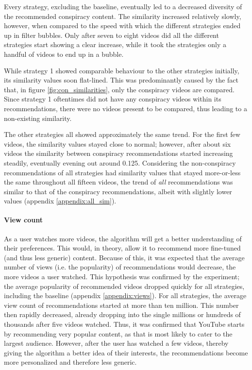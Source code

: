 \documentclass[../main.tex]{subfiles}
\begin{document}
Every strategy, excluding the baseline, eventually led to a decreased diversity of the recommended conspiracy 
content. The similarity increased relatively slowly, however, when compared to the speed with which the 
different strategies ended up in filter bubbles. Only after seven to eight videos did all the different 
strategies start showing a clear increase, while it took the strategies only a handful of videos to end up 
in a bubble.

While strategy 1 showed comparable behaviour to the other strategies initially, its similarity values soon 
flat-lined. This was predominantly caused by the fact that, in figure \ref{fig:con_similarities}, only the 
conspiracy videos are compared. Since strategy 1 oftentimes did not have any conspiracy videos within its 
recommendations, there were no videos present to be compared, thus leading to a non-existing similarity. 

The other strategies all showed approximately the same trend. For the first few videos, the similarity values 
stayed close to normal; however, after about six videos the similarity between conspiracy recommendations 
started increasing steadily, eventually evening out around 0.125. Considering the non-conspiracy recommendations
of all strategies had similarity values that stayed more-or-less the same throughout all fifteen videos, the 
trend of \textit{all} recommendations was similar to that of the conspiracy recommendations, albeit with 
slightly lower values (appendix \ref{appendix:all_sim}).

\paragraph{View count}
As a user watches more videos, the algorithm will get a better understanding of their preferences. This would, 
in theory, allow it to recommend more fine-tuned (and thus less generic) content. Because of this, it was 
expected that the average number of views (i.e. the popularity) of recommendations would decrease, the more 
videos a user watched. This hypothesis was confirmed by the experiment; the average popularity of recommended
videos dropped quickly for all strategies, including the baseline (appendix \ref{appendix:views}). For all
strategies, the average view count of recommendations started at more than ten million. This number then rapidly
decreased, already dropping into the single millions or hundreds of thousands after five videos watched. Thus,
it was confirmed that YouTube starts by recommending very popular content, as that is most likely to cater to
the largest audience. However, after the user has watched a few videos, thereby giving the algorithm a better
idea of their interests, the recommendations become more personalized and therefore less generic. 
\end{document}
